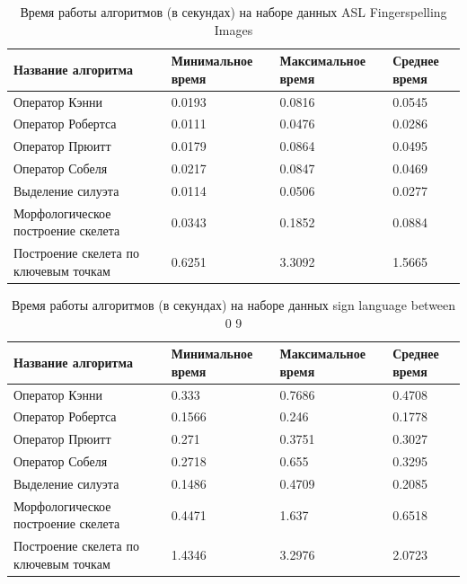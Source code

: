 \begin{table}[!h]
	\caption{\label{tab:asl2-alphaber}Время работы алгоритмов (в секундах) на наборе данных ASL Fingerspelling Images}
	\begin{center}
		\begin{tabular}{|p{}|p{}|p{}|p{}|}
			\hline
			Название алгоритма & Минимальное время & Максимальное время & Среднее время \\
			\hline
			Оператор Кэнни & 0.0193 & 0.0816 & 0.0545 \\
			Оператор Робертса & 0.0111 & 0.0476 & 0.0286 \\
			Оператор Прюитт & 0.0179 & 0.0864 & 0.0495 \\
			Оператор Собеля & 0.0217 & 0.0847 & 0.0469 \\
			Выделение силуэта & 0.0114 & 0.0506 & 0.0277 \\
			Морфологическое построение скелета & 0.0343 & 0.1852 & 0.0884 \\
			Построение скелета по ключевым точкам & 0.6251 & 3.3092 & 1.5665 \\
			\hline
		\end{tabular}
	\end{center}
\end{table}

\begin{table}[!h]
	\caption{\label{tab:datamix-alphaber}Время работы алгоритмов (в секундах) на наборе данных sign language between 0 9}
	\begin{center}
		\begin{tabular}{|p{}|p{}|p{}|p{}|}
			\hline
			Название алгоритма & Минимальное время & Максимальное время & Среднее время \\
			\hline
			Оператор Кэнни & 0.333 & 0.7686 & 0.4708 \\
			Оператор Робертса & 0.1566 & 0.246 & 0.1778 \\
			Оператор Прюитт & 0.271 & 0.3751 & 0.3027 \\
			Оператор Собеля & 0.2718 & 0.655 & 0.3295 \\
			Выделение силуэта & 0.1486 & 0.4709 & 0.2085 \\
			Морфологическое построение скелета & 0.4471 & 1.637 & 0.6518 \\
			Построение скелета по ключевым точкам & 1.4346 & 3.2976 & 2.0723 \\
			\hline
		\end{tabular}
	\end{center}
\end{table}

